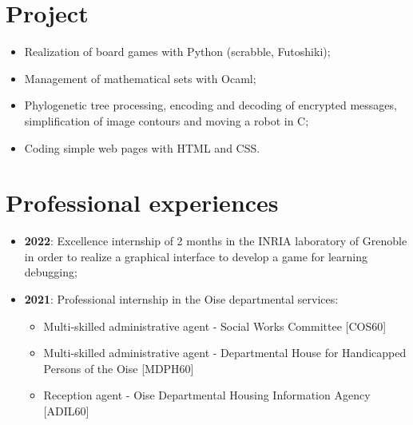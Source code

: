 \documentclass[10pt, oneside, a4paper, titlepage]{article}
\begin{document}
\begin{tcolorbox}
\begin{minipage}[t]{12cm}
\begin{tcolorbox}[grow to right by = 0.6cm, colback = gray!25, colframe = white]
                \section*{Project}
                \begin{itemize}
                    \item Realization of board games with Python (scrabble, Futoshiki);
                    \item Management of mathematical sets with Ocaml;
                    \item Phylogenetic tree processing, encoding and decoding of 
                    encrypted messages, simplification of image contours and moving 
                    a robot in C;
                    \item Coding simple web pages with HTML and CSS.

                \end{itemize}
                
                \section*{Professional experiences}
                \begin{itemize}
                    \item \textbf{2022}: Excellence internship of 2 months in the INRIA 
                    laboratory of Grenoble in order to realize a 
                    graphical interface to develop a game for learning
                    debugging;
                    \item \textbf{2021}: Professional internship in the Oise departmental services:
                    \begin{itemize}
                        
                        \item Multi-skilled administrative agent -  Social Works Committee [COS60]
                        \item Multi-skilled administrative agent - Departmental House for Handicapped Persons of the Oise [MDPH60]
                        \item Reception agent - Oise Departmental Housing Information Agency [ADIL60]
                        
                        
                        
                    \end{itemize}
                

\end{itemize}
\end{tcolorbox}
\end{minipage}
\end{tcolorbox}
\end{document}
